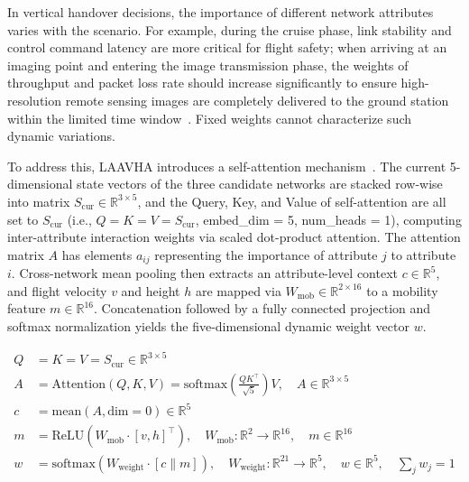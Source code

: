 \documentclass[journal,article,submit,moreauthors]{Definitions/mdpi}
\begin{document}
In vertical handover decisions, the importance of different network attributes varies with the scenario. For example, during the cruise phase, link stability and control command latency are more critical for flight safety; when arriving at an imaging point and entering the image transmission phase, the weights of throughput and packet loss rate should increase significantly to ensure high-resolution remote sensing images are completely delivered to the ground station within the limited time window~\cite{ref24}. Fixed weights cannot characterize such dynamic variations.

To address this, LAAVHA introduces a self-attention mechanism~\cite{ref18}. The current 5-dimensional state vectors of the three candidate networks are stacked row-wise into matrix $S_{\text{cur}} \in \mathbb{R}^{3 \times 5}$, and the Query, Key, and Value of self-attention are all set to $S_{\text{cur}}$ (i.e., $Q = K = V = S_{\text{cur}}$, embed\_dim = 5, num\_heads = 1), computing inter-attribute interaction weights via scaled dot-product attention. The attention matrix $A$ has elements $a_{ij}$ representing the importance of attribute $j$ to attribute $i$. Cross-network mean pooling then extracts an attribute-level context $c \in \mathbb{R}^5$, and flight velocity $v$ and height $h$ are mapped via $W_{\text{mob}} \in \mathbb{R}^{2 \times 16}$ to a mobility feature $m \in \mathbb{R}^{16}$. Concatenation followed by a fully connected projection and softmax normalization yields the five-dimensional dynamic weight vector $w$.

\begin{equation}
\begin{aligned}
Q &= K = V = S_{\text{cur}} \in \mathbb{R}^{3 \times 5} \\
A &= \text{Attention}(Q,K,V) = \text{softmax}\!\left(\frac{QK^\top}{\sqrt{5}}\right) V, \quad A \in \mathbb{R}^{3 \times 5} \\
c &= \text{mean}(A, \text{dim}=0) \in \mathbb{R}^5 \\
m &= \text{ReLU}(W_{\text{mob}} \cdot [v, h]^\top), \quad W_{\text{mob}}: \mathbb{R}^2 \rightarrow \mathbb{R}^{16}, \quad m \in \mathbb{R}^{16} \\
w &= \text{softmax}(W_{\text{weight}} \cdot [c \parallel m]), \quad W_{\text{weight}}: \mathbb{R}^{21} \rightarrow \mathbb{R}^5, \quad w \in \mathbb{R}^5, \quad \sum_j w_j = 1
\end{aligned}
\label{eq:attention}
\end{equation}
\end{document}
